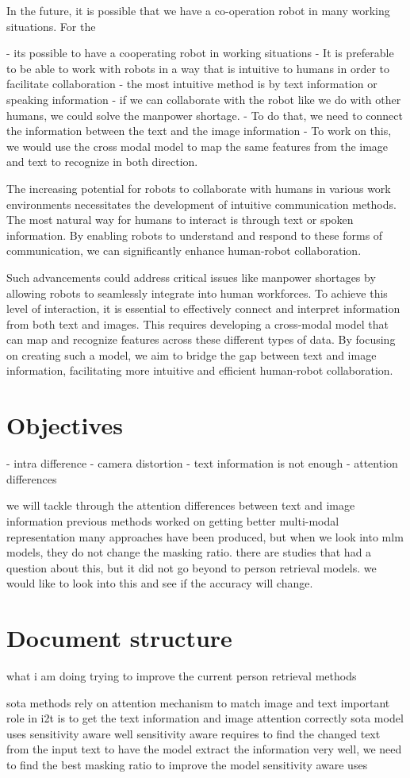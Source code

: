 In the future, it is possible that we have a co-operation robot in many working situations. For the 

- its possible to have a cooperating robot in working situations
- It is preferable to be able to work with robots in a way that is intuitive to humans in order to facilitate collaboration
- the most intuitive method is by text information or speaking information 
- if we can collaborate with the robot like we do with other humans, we could solve the manpower shortage.
- To do that, we need to connect the information between the text and the image information 
- To work on this, we would use the cross modal model to map the same features from the image and text to recognize in both direction.

The increasing potential for robots to collaborate with humans in various work environments necessitates the development of intuitive communication methods. The most natural way for humans to interact is through text or spoken information. By enabling robots to understand and respond to these forms of communication, we can significantly enhance human-robot collaboration.

Such advancements could address critical issues like manpower shortages by allowing robots to seamlessly integrate into human workforces. To achieve this level of interaction, it is essential to effectively connect and interpret information from both text and images. This requires developing a cross-modal model that can map and recognize features across these different types of data. By focusing on creating such a model, we aim to bridge the gap between text and image information, facilitating more intuitive and efficient human-robot collaboration.

\section{Objectives}
- intra difference
- camera distortion
- text information is not enough
- attention differences

we will tackle through the attention differences between text and image information
previous methods worked on getting better multi-modal representation 
many approaches have been produced, but when we look into mlm models, they do not change the masking ratio. there are studies that had a question about this, but it did not go beyond to person retrieval models. we would like to look into this and see if the accuracy will change.

\section{Document structure}

what i am doing 
trying to improve the current person retrieval methods

sota methods rely on attention mechanism to match image and text 
important role in i2t is to get the text information and image attention correctly 
sota model uses sensitivity aware well 
sensitivity aware requires to find the changed text from the input text 
to have the model extract the information very well, we need to find the best masking ratio to improve the model
sensitivity aware uses 
